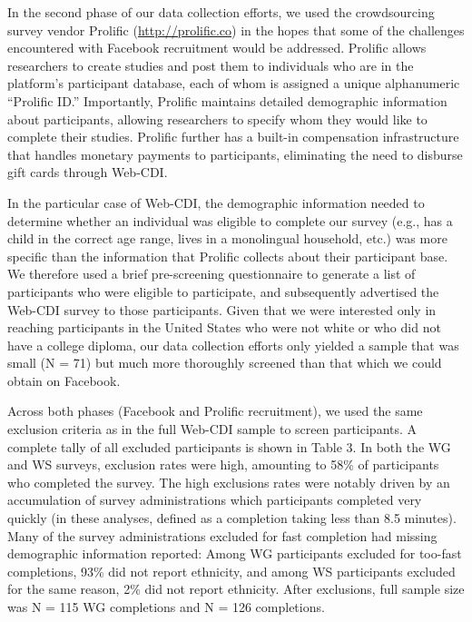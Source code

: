 \documentclass[
  english,
  ,man,floatsintext]{apa6}
\begin{document}
In the second phase of our data collection efforts, we used the crowdsourcing survey vendor Prolific (\url{http://prolific.co}) in the hopes that some of the challenges encountered with Facebook recruitment would be addressed. Prolific allows researchers to create studies and post them to individuals who are in the platform's participant database, each of whom is assigned a unique alphanumeric \enquote{Prolific ID.} Importantly, Prolific maintains detailed demographic information about participants, allowing researchers to specify whom they would like to complete their studies. Prolific further has a built-in compensation infrastructure that handles monetary payments to participants, eliminating the need to disburse gift cards through Web-CDI.

In the particular case of Web-CDI, the demographic information needed to determine whether an individual was eligible to complete our survey (e.g., has a child in the correct age range, lives in a monolingual household, etc.) was more specific than the information that Prolific collects about their participant base. We therefore used a brief pre-screening questionnaire to generate a list of participants who were eligible to participate, and subsequently advertised the Web-CDI survey to those participants. Given that we were interested only in reaching participants in the United States who were not white or who did not have a college diploma, our data collection efforts only yielded a sample that was small (N = 71) but much more thoroughly screened than that which we could obtain on Facebook.

Across both phases (Facebook and Prolific recruitment), we used the same exclusion criteria as in the full Web-CDI sample to screen participants. A complete tally of all excluded participants is shown in Table 3. In both the WG and WS surveys, exclusion rates were high, amounting to 58\% of participants who completed the survey. The high exclusions rates were notably driven by an accumulation of survey administrations which participants completed very quickly (in these analyses, defined as a completion taking less than 8.5 minutes). Many of the survey administrations excluded for fast completion had missing demographic information reported: Among WG participants excluded for too-fast completions, 93\% did not report ethnicity, and among WS participants excluded for the same reason, 2\% did not report ethnicity. After exclusions, full sample size was N = 115 WG completions and N = 126 completions.
\end{document}

